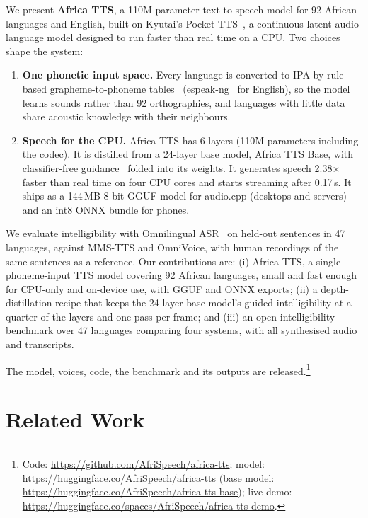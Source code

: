 \documentclass[10pt,twocolumn]{article}
\newcommand{\att}{Africa TTS}
\newcommand{\attbase}{Africa TTS Base}
\newcommand{\nTrainedLangs}{47}
\newcommand{\xrtturbopython}{2.38}
\newcommand{\ttfaturbopython}{0.17}
\begin{document}
We present \textbf{\att{}}, a 110M-parameter text-to-speech model for 92 African languages and English,
built on Kyutai's Pocket TTS~\cite{pockettts,rouard2025calm}, a continuous-latent audio language
model designed to run faster than real time on a CPU. Two choices shape the system:
\begin{enumerate}
  \item \textbf{One phonetic input space.} Every language is converted to IPA by rule-based
  grapheme-to-phoneme tables~\cite{africag2p} (espeak-ng~\cite{espeakng} for English), so the
  model learns sounds rather than 92 orthographies, and languages with little data share
  acoustic knowledge with their neighbours.
  \item \textbf{Speech for the CPU.} \att{} has 6 layers (110M parameters including the
  codec). It is distilled from a 24-layer base model, \attbase{}, with classifier-free
  guidance~\cite{ho2022cfg} folded into its weights. It generates speech
  \xrtturbopython{}$\times$ faster than real time on four CPU cores and starts streaming after
  \ttfaturbopython{}\,s. It ships as a 144\,MB 8-bit GGUF model for audio.cpp (desktops and
  servers) and an int8 ONNX bundle for phones.
\end{enumerate}

We evaluate intelligibility with Omnilingual ASR~\cite{omniasr2025} on held-out sentences in
\nTrainedLangs{} languages, against MMS-TTS and OmniVoice, with human recordings of the same sentences as a reference.
Our contributions are: (i) \att{}, a single phoneme-input TTS model covering 92 African
languages, small and fast enough for CPU-only and on-device use, with GGUF and ONNX exports; (ii) a
depth-distillation recipe that keeps the 24-layer base model's guided intelligibility at a
quarter of the layers and one pass per frame; and (iii) an open intelligibility benchmark over \nTrainedLangs{} languages comparing four systems, with all
synthesised audio and transcripts.

The model, voices, code, the benchmark and its outputs are released.\footnote{Code:
\url{https://github.com/AfriSpeech/africa-tts}; model:
\url{https://huggingface.co/AfriSpeech/africa-tts} (base model:
\url{https://huggingface.co/AfriSpeech/africa-tts-base}); live demo:
\url{https://huggingface.co/spaces/AfriSpeech/africa-tts-demo}.}

\section{Related Work}
\end{document}
